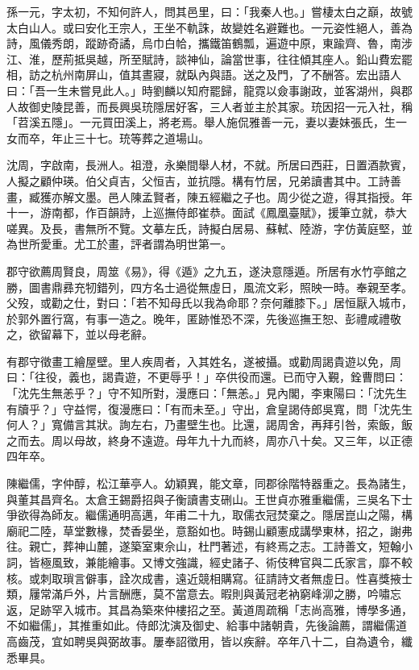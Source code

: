 \begin{pinyinscope}
孫一元，字太初，不知何許人，問其邑里，曰：「我秦人也。」嘗棲太白之巔，故號太白山人。或曰安化王宗人，王坐不軌誅，故變姓名避難也。一元姿性絕人，善為詩，風儀秀朗，蹤跡奇譎，烏巾白帢，攜鐵笛鶴瓢，遍遊中原，東踰齊、魯，南涉江、淮，歷荊抵吳越，所至賦詩，談神仙，論當世事，往往傾其座人。鉛山費宏罷相，訪之杭州南屏山，值其晝寢，就臥內與語。送之及門，了不酬答。宏出語人曰：「吾一生未嘗見此人。」時劉麟以知府罷歸，龍霓以僉事謝政，並客湖州，與郡人故御史陵昆善，而長興吳珫隱居好客，三人者並主於其家。珫因招一元入社，稱「苕溪五隱」。一元買田溪上，將老焉。舉人施侃雅善一元，妻以妻妹張氏，生一女而卒，年止三十七。珫等葬之道場山。

沈周，字啟南，長洲人。祖澄，永樂間舉人材，不就。所居曰西莊，日置酒款賓，人擬之顧仲瑛。伯父貞吉，父恒吉，並抗隱。構有竹居，兄弟讀書其中。工詩善畫，臧獲亦解文墨。邑人陳孟賢者，陳五經繼之子也。周少從之遊，得其指授。年十一，游南都，作百韻詩，上巡撫侍郎崔恭。面試《鳳凰臺賦》，援筆立就，恭大嗟異。及長，書無所不覽。文摹左氏，詩擬白居易、蘇軾、陸游，字仿黃庭堅，並為世所愛重。尤工於畫，評者謂為明世第一。

郡守欲薦周賢良，周筮《易》，得《遁》之九五，遂決意隱遁。所居有水竹亭館之勝，圖書鼎彞充牣錯列，四方名士過從無虛日，風流文彩，照映一時。奉親至孝。父歿，或勸之仕，對曰：「若不知母氏以我為命耶？奈何離膝下。」居恒厭入城市，於郭外置行窩，有事一造之。晚年，匿跡惟恐不深，先後巡撫王恕、彭禮咸禮敬之，欲留幕下，並以母老辭。

有郡守徵畫工繪屋壁。里人疾周者，入其姓名，遂被攝。或勸周謁貴遊以免，周曰：「往役，義也，謁貴遊，不更辱乎！」卒供役而還。已而守入覲，銓曹問曰：「沈先生無恙乎？」守不知所對，漫應曰：「無恙。」見內閣，李東陽曰：「沈先生有牘乎？」守益愕，復漫應曰：「有而未至。」守出，倉皇謁侍郎吳寬，問「沈先生何人？」寬備言其狀。詢左右，乃畫壁生也。比還，謁周舍，再拜引咎，索飯，飯之而去。周以母故，終身不遠遊。母年九十九而終，周亦八十矣。又三年，以正德四年卒。

陳繼儒，字仲醇，松江華亭人。幼穎異，能文章，同郡徐階特器重之。長為諸生，與董其昌齊名。太倉王錫爵招與子衡讀書支硎山。王世貞亦雅重繼儒，三吳名下士爭欲得為師友。繼儒通明高邁，年甫二十九，取儒衣冠焚棄之。隱居崑山之陽，構廟祀二陸，草堂數椽，焚香晏坐，意豁如也。時錫山顧憲成講學東林，招之，謝弗往。親亡，葬神山麓，遂築室東佘山，杜門著述，有終焉之志。工詩善文，短翰小詞，皆極風致，兼能繪事。又博文強識，經史諸子、術伎稗官與二氏家言，靡不較核。或刺取瑣言僻事，詮次成書，遠近競相購寫。征請詩文者無虛日。性喜獎掖士類，屨常滿戶外，片言酬應，莫不當意去。暇則與黃冠老衲窮峰泖之勝，吟嘯忘返，足跡罕入城市。其昌為築來仲樓招之至。黃道周疏稱「志尚高雅，博學多通，不如繼儒」，其推重如此。侍郎沈演及御史、給事中諸朝貴，先後論薦，謂繼儒道高齒茂，宜如聘吳與弼故事。屢奉詔徵用，皆以疾辭。卒年八十二，自為遺令，纖悉畢具。


\end{pinyinscope}